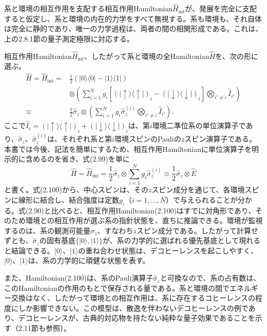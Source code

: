 系と環境の相互作用を支配する相互作用Hamiltonian$\hat H_{\mathrm{int}}$が、発展を完全に支配すると仮定し、系と環境の内在的力学をすべて無視する。系も環境も、それ自体は完全に静的であり、唯一の力学過程は、両者の間の相関形成である。これは、上の2.8.1節の量子測定極限に対応する。

相互作用Hamiltonian$\hat H_{\mathrm{int}}$、したがって系と環境の全Hamiltonian$\hat H$を、次の形に選ぶ。
\begin{equation}\begin{split}
\hat H=\hat H_{\mathrm{int}}={}&\frac12(\lvert0\rangle\langle0\rvert-\lvert1\rangle\langle1\rvert)\\
&\otimes\left(\sum_{i=1}^N g_i[(\lvert\uparrow\rangle\langle\uparrow\rvert)_i-(\lvert\downarrow\rangle\langle\downarrow\rvert)_i]\bigotimes_{i'\ne i}\hat I_{i'}\right)\\
\equiv{}&\frac12\hat\sigma_z\otimes\left(\sum_{i=1}^N g_i\hat\sigma_z^{(i)}\bigotimes_{i'\ne i}\hat I_{i'}\right).
\end{split}\tag{2.99}\end{equation}
ここで$\hat I_i=(\lvert\uparrow\rangle\langle\uparrow\rvert)_i+(\lvert\downarrow\rangle\langle\downarrow\rvert)_i$は、第$i$環境二準位系の単位演算子であり、$\hat\sigma_z$、$\hat\sigma_z^{(i)}$は、それぞれ系と第$i$環境スピンのPauliの$z$スピン演算子である。本書では今後、記法を簡単にするため、相互作用Hamiltonianに単位演算子を明示的に含めるのを省き、式(2.99)を単に
\begin{equation}\hat H=\hat H_{\mathrm{int}}=\frac12\hat\sigma_z\otimes\sum_{i=1}^N g_i\hat\sigma_z^{(i)}\equiv\frac12\hat\sigma_z\otimes\hat E\tag{2.100}\end{equation}
と書く。式(2.100)から、中心スピンは、その$z$スピン成分を通じて、各環境スピンに線形に結合し、結合強度は定数$g_i$（$i=1,\ldots,N$）で与えられることが分かる。式(2.90)と比べると、相互作用Hamiltonian(2.100)はすでに対角形であり、そのため環境との相互作用が選ぶ系の指針状態を、直ちに推論できる。環境が監視するのは、系の観測可能量$\hat\sigma_z$、すなわち$z$スピン成分である。したがって計算せずとも、$\hat\sigma_z$の固有基底$\{\lvert0\rangle,\lvert1\rangle\}$が、系の力学的に選ばれる優先基底として現れると結論できる。$\lvert0\rangle$、$\lvert1\rangle$の重ね合わせ状態は、デコヒーレンスを起こしやすく、$\lvert0\rangle$、$\lvert1\rangle$は、系の力学的に頑健な状態を表す。

\hypertarget{srcpage:90}{}\label{srcpage:90}
また、Hamiltonian(2.100)は、系のPauli演算子$\hat\sigma_z$と可換なので、系の占有数は、このHamiltonianの作用のもとで保存される量である。系と環境の間でエネルギー交換はなく、したがって環境との相互作用は、系に存在するコヒーレンスの程度にしか影響できない。この模型は、散逸を伴わないデコヒーレンスの例であり、デコヒーレンスが、古典的対応物を持たない純粋な量子効果であることを示す（2.11節も参照）。

